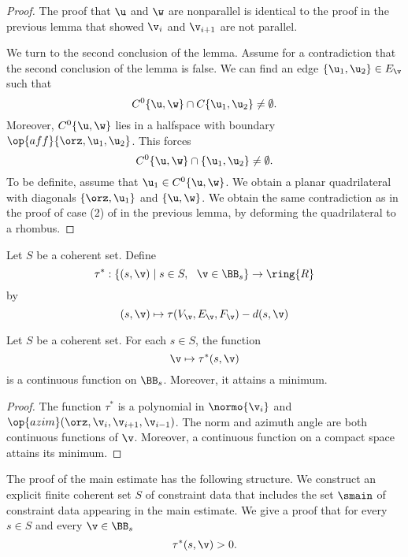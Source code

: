 \begin{proof} 
The proof that $\u$ and $\w$ are nonparallel is identical to the
proof in the previous lemma that showed $\v_i$ and $\v_{i+1}$ are not parallel.

We turn to the second conclusion of the lemma.
Assume for a contradiction that the second conclusion of the lemma is false.
We can find an edge $\{\u_1,\u_2\}\in E_\v$ such that 
\[
C^0\{\u,\w\}\cap C\{\u_1,\u_2\}\ne \emptyset.
\]
Moreover, $C^0\{\u,\w\}$ lies in a halfspace with boundary
$\op{aff}\{\orz,\u_1,\u_2\}$.  This forces 
\[
C^0\{\u,\w\}\cap \{\u_1,\u_2\}\ne \emptyset.
\]
To be definite, assume that $\u_1\in C^0\{\u,\w\}$.  
We obtain a planar quadrilateral with diagonals
$\{\orz,\u_1\}$ and $\{\u,\w\}$.  We obtain the same contradiction
as in the proof of case (2) of  in the previous lemma,
by deforming the quadrilateral to a rhombus.
\end{proof}

\begin{definition}[$\tau^*$]\label{def:tau-star}
%
Let $S$ be a coherent set.  Define 
\[
\tau^*:\{(s,\v)\mid s\in S,\ \ \v\in \BB_s\} \to \ring{R}
\] 
by
\[ 
(s,\v) \mapsto \tau(V_\v,E_\v,F_\v)-d(s,\v)
\] 
\end{definition}

\begin{lemma}[continuity]\label{lemma:compact-fan}
Let $S$ be a coherent set. For each $s\in S$, the function 
\[
\v\mapsto \tau^*(s,\v)
\]
is a continuous function on $\BB_s$.  Moreover, it attains a minimum.
\end{lemma}

\begin{proof} 
The function $\tau^*$ is a polynomial in $\normo{\v_i}$ and
$\op{azim}(\orz,\v_i,\v_{i+1},\v_{i-1})$.  The norm and azimuth
angle are both continuous functions of $\v$.
Moreover, a continuous function on a compact space attains its minimum.
\end{proof}



The proof of the main estimate has the following structure.  We
construct an explicit finite coherent set $S$ of constraint data that
includes the set $\smain$ of constraint data appearing in the main
estimate.  We give a proof that for every $s\in S$ and every $\v\in
\BB_s$
\begin{equation}\label{eqn:main:sv}
\tau^*(s,\v)> 0.
\end{equation}


